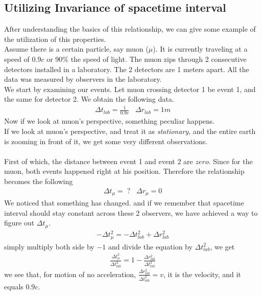 \documentclass[12pt]{book}
\begin{document}
\subsection{Utilizing Invariance of spacetime interval}
After understanding the basics of this relationship, we can give some example of the utilization of this properties.\\
\newline
Assume there is a certain particle, say muon ($\mu$). It is currently traveling at a speed of $0.9c$ or 90\% the speed of light. The muon zips through 2 consecutive detectors installed in a laboratory. The 2 detectors are 1 meters apart. All the data was measured by observers in the laboratory. \\
\newline
We start by examining our events. Let muon crossing detector 1 be event 1, and the same for detector 2. We obtain the following data.
\begin{align}
\Delta t_{lab} = \frac{1}{0.9c} \;\;\; \Delta r_{lab} = 1m
\end{align}
Now if we look at muon's perspective, something peculiar happens. \\
\newline 
If we look at muon's perspective, and treat it as \textit{stationary}, and the entire earth is zooming in front of it, we get some very different observations.\\
\\
First of which, the distance between event 1 and event 2 are $zero$. Since for the muon, both events happened right at his position. Therefore the relationship becomes the following
\begin{align}
\Delta t_\mu = \;? \;\;\; \Delta r_\mu = 0
\end{align}
We noticed that something has changed. and if we remember that spacetime interval should stay constant across these 2 observers, we have achieved a way to figure out $\Delta t_\mu$.
\begin{align}
-\Delta t_\mu^2 = -\Delta t_{lab}^2 +\Delta r_{lab}^2
\end{align}
simply multiply both side by $-1$ and divide the equation by $\Delta t_{lab}^2$, we get 
\begin{align}
\frac{\Delta t_\mu^2}{\Delta t_{lab}^2} = 1 - \frac{\Delta r_{lab}^2}{\Delta t_{lab}^2}
\end{align}
we see that, for motion of no acceleration, $\frac{\Delta r_{lab}^2}{\Delta t_{lab}^2} = v$, it is the velocity, and it equals $0.9c$.
\end{document}
